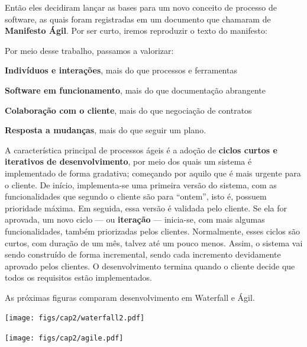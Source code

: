\documentclass[
  11pt,
  twoside]{book}
\renewenvironment{quote}{\centering \vspace{1.5ex} \begin{tcolorbox}[colback=backcolor, width=4.9in]}{\end{tcolorbox}}
\let\origfigure\figure
\let\endorigfigure\endfigure
\renewenvironment{figure}[1][2] {
    \expandafter\origfigure\expandafter[!h]
} {
    \endorigfigure
}
\begin{document}
Então eles decidiram lançar as bases para um novo conceito de processo
de software, as quais foram registradas em um documento que chamaram de
\textbf{Manifesto Ágil}. Por ser curto, iremos reproduzir o texto do
manifesto:

\begin{quote}
Por meio desse trabalho, passamos a valorizar:

\textbf{Indivíduos e interações}, mais do que processos e ferramentas

\textbf{Software em funcionamento}, mais do que documentação abrangente

\textbf{Colaboração com o cliente}, mais do que negociação de contratos

\textbf{Resposta a mudanças}, mais do que seguir um plano.
\end{quote}

 A característica principal de processos ágeis é a
adoção de \textbf{ciclos curtos e iterativos de desenvolvimento}, por
meio dos quais um sistema é implementado de forma gradativa; começando
por aquilo que é mais urgente para o cliente. De início, implementa-se
uma primeira versão do sistema, com as funcionalidades que segundo o
cliente são para ``ontem'', isto é, possuem prioridade máxima. Em
seguida, essa versão é validada pelo cliente. Se ela for aprovada, um
novo ciclo --- ou \textbf{iteração} --- inicia-se, com mais algumas
funcionalidades, também priorizadas pelos clientes. Normalmente, esses
ciclos são curtos, com duração de um mês, talvez até um pouco menos.
Assim, o sistema vai sendo construído de forma incremental, sendo cada
incremento devidamente aprovado pelos clientes. O desenvolvimento
termina quando o cliente decide que todos os requisitos estão
implementados.

 As próximas figuras comparam desenvolvimento em
Waterfall e Ágil.

\begin{figure}
\centering
\texttt{[image: figs/cap2/waterfall2.pdf]}
\caption{Desenvolvimento usando um Processo Waterfall. O sistema fica
pronto apenas no final.}
\end{figure}

\begin{figure}
\centering
\texttt{[image: figs/cap2/agile.pdf]}
\caption{Desenvolvimento usando um Processo Ágil. A cada iteração
(representada pelos retângulos) gera-se um incremento no sistema (S++),
que já pode ser validado e testado pelos usuários finais.}
\end{figure}
\end{document}

